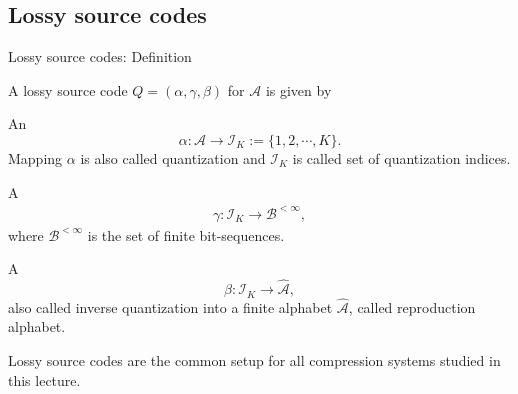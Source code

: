 \subsection{Lossy source codes}
\begin{frame}{Lossy source codes: Definition}
\begin{definition}
A lossy source code $Q=(\alpha,\gamma,\beta)$ for $\mathcal{A}$ is given by
\bit
\item An  
\[
\alpha: \mathcal{A}\to \mathcal{I}_K:=\{1,2,\cdots,K\}. 
\]
Mapping $\alpha$ is also called quantization and $\mathcal{I}_K$ is called set of quantization indices. 
\item A  
\begin{align*}
\gamma: \mathcal{I}_K\to \mathcal{B}^{<\infty}, 
\end{align*}
where $\mathcal{B}^{<\infty}$ is the 
set of finite bit-sequences.
\item A 
\[
\beta: \mathcal{I}_K\to\widehat{\mathcal{A}},
\]
also called inverse quantization into a finite alphabet $\widehat{\mathcal{A}}$, called reproduction alphabet.
\eit
\end{definition}
Lossy source codes are the common setup for all compression systems studied in this lecture. 
\end{frame}

